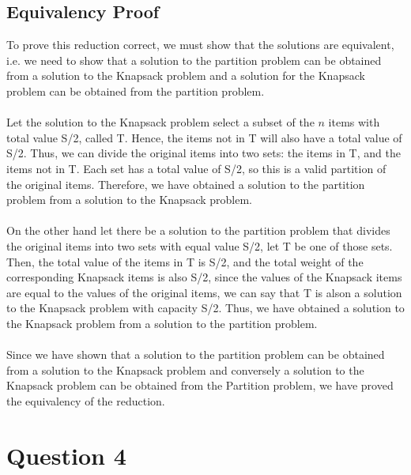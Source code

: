 \documentclass{article}
\begin{document}
\subsection{Equivalency Proof}
To prove this reduction correct, we must show that the solutions are equivalent, i.e. we need to show that a solution to the partition problem can be obtained from a solution to the Knapsack problem and a solution for the Knapsack problem can be obtained from the partition problem.\\\\
Let the solution to the Knapsack problem select a subset of the $n$ items with total value S/2, called T. Hence, the items not in T will also have a total value of S/2. Thus, we can divide the original items into two sets: the items in T, and the items not in T. Each set has a total value of S/2, so this is a valid partition of the original items. Therefore, we have obtained a solution to the partition problem from a solution to the Knapsack problem.\\\\
On the other hand let there be a solution to the partition problem that divides the original items into two sets with equal value S/2, let T be one of those sets. Then, the total value of the items in T is S/2, and the total weight of the corresponding Knapsack items is also S/2, since the values of the Knapsack items are equal to the values of the original items, we can say that T is alson a solution to the Knapsack problem with capacity S/2. Thus, we have obtained a solution to the Knapsack problem from a solution to the partition problem.\\\\
Since we have shown that a solution to the partition problem can be obtained from a solution to the Knapsack problem and conversely a solution to the Knapsack problem can be obtained from the Partition problem, we have proved the equivalency of the reduction.

\section{Question 4}
\end{document}
